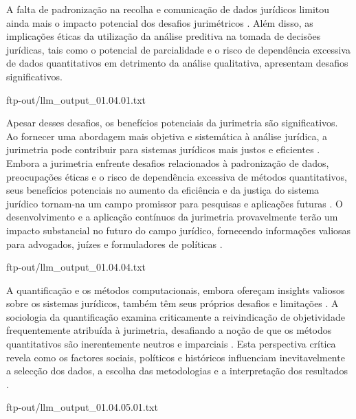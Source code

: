 \begin{agradecimentos}
A falta de padronização na recolha e comunicação de dados jurídicos limitou ainda mais o impacto potencial dos desafios jurimétricos \cite{jurimetricschallenges}. Além disso, as implicações éticas da utilização da análise preditiva na tomada de decisões jurídicas, tais como o potencial de parcialidade e o risco de dependência excessiva de dados quantitativos em detrimento da análise qualitativa, apresentam desafios significativos. 
    
    ftp-out/llm_output_01.04.01.txt 
    
    Apesar desses desafios, os benefícios potenciais da jurimetria são significativos. Ao fornecer uma abordagem mais objetiva e sistemática à análise jurídica, a jurimetria pode contribuir para sistemas jurídicos mais justos e eficientes \cite{jurimetricschallenges}. Embora a jurimetria enfrente desafios relacionados à padronização de dados, preocupações éticas e o risco de dependência excessiva de métodos quantitativos, seus benefícios potenciais no aumento da eficiência e da justiça do sistema jurídico tornam-na um campo promissor para pesquisas e aplicações futuras \cite{jurimetricschallenges }. O desenvolvimento e a aplicação contínuos da jurimetria provavelmente terão um impacto substancial no futuro do campo jurídico, fornecendo informações valiosas para advogados, juízes e formuladores de políticas \cite{jurimetricschallenges}. 
    
    ftp-out/llm_output_01.04.04.txt 
    
    A quantificação e os métodos computacionais, embora ofereçam insights valiosos sobre os sistemas jurídicos, também têm seus próprios desafios e limitações \cite{10.1590/dados.2022.65.3.267,10.1057/s41599- 020-00557-0}. A sociologia da quantificação examina criticamente a reivindicação de objetividade frequentemente atribuída à jurimetria, desafiando a noção de que os métodos quantitativos são inerentemente neutros e imparciais \cite{10.1590/dados.2022.65.3.267,10.1057/s41599-020-00557-0}. Esta perspectiva crítica revela como os factores sociais, políticos e históricos influenciam inevitavelmente a selecção dos dados, a escolha das metodologias e a interpretação dos resultados \cite{10.1590/dados.2022.65.3.267,salais2016quantification}. 
    
    ftp-out/llm_output_01.04.05.01.txt 
    

\end{agradecimentos}
